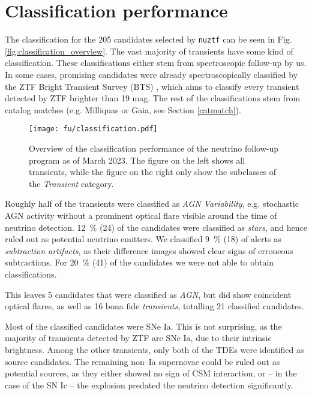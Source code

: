 \section{Classification performance} \label{classification_performance}
The classification for the 205 candidates selected by \texttt{nuztf} can be seen in Fig. \ref{fig:classification_overview}. The vast majority of transients have some kind of classification. These classifications either stem from spectroscopic follow-up by us. In some cases, promising candidates were already spectroscopically classified by the ZTF Bright Transient Survey (BTS) , which aims to classify every transient detected by ZTF brighter than 19 mag. The rest of the classifications stem from catalog matches (e.g. Milliquas or Gaia, see Section \ref{catmatch}).

\begin{figure*}[t]
    \texttt{[image: fu/classification.pdf]}
    \caption[Follow-up classification overview]{Overview of the classification performance of the neutrino follow-up program as of March 2023. The figure on the left shows all transients, while the figure on the right only show the subclasses of the \textit{Transient} category.}
\end{figure*}

Roughly half of the transients were classified as \textit{AGN Variability}, e.g. stochastic AGN activity without a prominent optical flare visible around the time of neutrino detection. \SI{12}{\percent} (24) of the candidates were classified as \textit{stars}, and hence ruled out as potential neutrino emitters. We classified \SI{9}{\percent} (18) of alerts as \textit{subtraction artifacts}, as their difference images showed clear signs of erroneous subtractions. For \SI{20}{\percent} (41) of the candidates we were not able to obtain classifications. 

This leaves 5 candidates that were classified as \textit{AGN}, but did show coincident optical flares, as well as 16 bona fide \textit{transients}, totalling 21 classified candidates.

Most of the classified candidates were SNe Ia. This is not surprising, as the majority of transients detected by ZTF are SNe Ia, due to their intrinsic brightness. Among the other transients, only both of the TDEs were identified as source candidates. The remaining non--Ia supernovae could be ruled out as potential sources, as they either showed no sign of CSM interaction, or -- in the case of the SN Ic -- the explosion predated the neutrino detection significantly.

